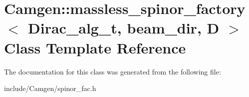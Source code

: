 \hypertarget{a00359}{}\section{Camgen\+:\+:massless\+\_\+spinor\+\_\+factory$<$ Dirac\+\_\+alg\+\_\+t, beam\+\_\+dir, D $>$ Class Template Reference}
\label{a00359}


The documentation for this class was generated from the following file\+:\begin{DoxyCompactItemize}
\item 
include/\+Camgen/spinor\+\_\+fac.\+h\end{DoxyCompactItemize}
